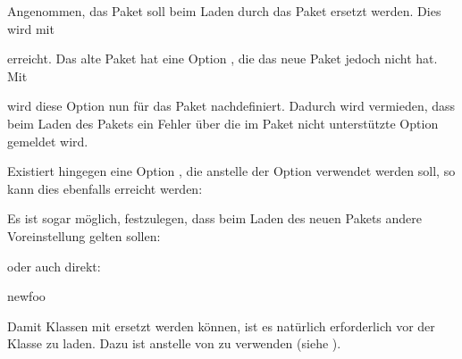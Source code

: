 \begin{Example}
  Angenommen, das Paket  soll beim Laden durch das
  Paket  ersetzt werden. Dies wird mit
\begin{lstcode}
\end{lstcode}
  erreicht. Das alte Paket hat eine Option , die das neue Paket
  jedoch nicht hat. Mit
\begin{lstcode}
\end{lstcode}
  wird diese Option nun für das Paket  nachdefiniert. Dadurch
  wird vermieden, dass beim Laden des Pakets  ein Fehler über
  die im Paket  nicht unterstützte Option gemeldet wird.

  Existiert hingegen eine Option , die anstelle der Option
   verwendet werden soll, so kann dies ebenfalls erreicht
  werden:
\begin{lstcode}
\end{lstcode}
  Es ist sogar möglich, festzulegen, dass beim Laden des neuen Pakets
  andere Voreinstellung gelten sollen:
\begin{lstcode}
\end{lstcode}
  oder auch direkt:
\begin{lstcode}
                       {newfoo}%
\end{lstcode}
  \iffalse%
  Man beachte, dass im letzten Beispiel der Aufruf von
  \Macro{PassOptionsToPackage} nicht innerhalb, sondern nach
  \Macro{BeforePackage} erfolgt.%
  \fi%
\end{Example}

Damit Klassen mit  ersetzt werden können, ist es natürlich
erforderlich  vor der Klasse zu laden. Dazu ist
 anstelle von
 zu verwenden (siehe \cite{latex:clsguide}).%
\EndIndexGroup


